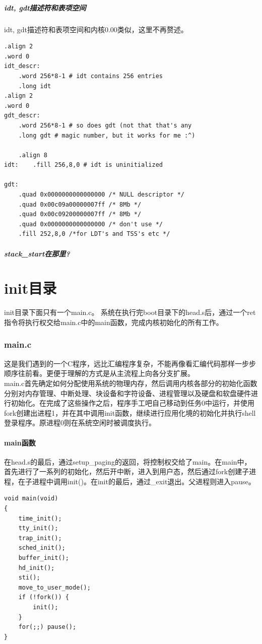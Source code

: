 \documentclass[12pt]{article}
\begin{document}
\subsubsection{idt, gdt描述符和表项空间}	
idt, gdt描述符和表项空间和内核0.00类似，这里不再赘述。
\begin{lstlisting}[breaklines]
.align 2
.word 0
idt_descr:
	.word 256*8-1 # idt contains 256 entries
	.long idt
.align 2
.word 0
gdt_descr:
	.word 256*8-1 # so does gdt (not that that's any
	.long gdt # magic number, but it works for me :^)

	.align 8 
idt:	.fill 256,8,0 # idt is uninitialized

gdt:
	.quad 0x0000000000000000 /* NULL descriptor */
	.quad 0x00c09a00000007ff /* 8Mb */
	.quad 0x00c09200000007ff /* 8Mb */
	.quad 0x0000000000000000 /* don't use */
	.fill 252,8,0 /*for LDT's and TSS's etc */
\end{lstlisting}
\subsubsection{stack\_start在那里?}	
\part{init目录}
init目录下面只有一个main.c。 系统在执行完boot目录下的head.s后，通过一个ret指令将执行权交给main.c中的main函数，完成内核初始化的所有工作。
\section{main.c}
这是我们遇到的一个C程序，远比汇编程序复杂，不能再像看汇编代码那样一步步顺序往前看。更便于理解的方式是从主流程上向各分支扩展。\\
main.c首先确定如何分配使用系统的物理内存，然后调用内核各部分的初始化函数分别对内存管理、中断处理、块设备和字符设备、进程管理以及硬盘和软盘硬件进行初始化。在完成了这些操作之后，程序手工吧自己移动到任务0中运行，并使用fork创建出进程1，并在其中调用init函数，继续进行应用化境的初始化并执行shell登录程序。原进程0则在系统空闲时被调度执行。
\subsection{main函数}
在head.s的最后，通过setup\_paging的返回，将控制权交给了main。在main中，首先进行了一系列的初始化，然后开中断，进入到用户态，然后通过fork创建子进程，在子进程中调用init()。在init的最后，通过\_exit退出。父进程则进入pause。
\begin{lstlisting}[breaklines]
void main(void)
{
	time_init();
	tty_init();
	trap_init();
	sched_init();
	buffer_init();
	hd_init();
	sti();
	move_to_user_mode();
	if (!fork()) {
		init();
	}
	for(;;) pause();
}
\end{lstlisting}
\end{document}
